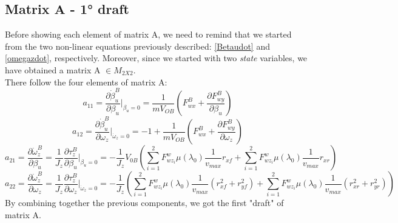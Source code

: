 \subsection{Matrix $\mathbf{A}$ - 1° draft}
	Before showing each element of matrix A, we  need to remind that we started from the two non-linear equations previously described: \ref{Betaudot} and \ref{omegazdot}, respectively. Moreover, since we started with two \textit{state} variables, we have obtained a matrix A $\in M_{2X2}$.\\ There follow the four elements of matrix A:
		\begin{equation} \label{a11}
			a_{11} = \frac{\partial\dot{\beta}_{u}^{B}}{\partial\beta_{u}}\vert_{\beta_{u}=0}  = \frac{1}{mV_{OB}}(F_{wx}^{B} + \frac{\partial F_{wy}^{B}}{\partial\beta_{u}})
		\end{equation} 
		\begin{equation} \label{a12}
			a_{12} = \frac{\partial\dot{\beta}_{u}^{B}}{\partial\omega_{z}}\vert_{\dot\omega_{z}=0} = -1 + \frac{1}{mV_{OB}} (F_{wx}^{B} + \frac{\partial F_{wy}^{B}}{\partial\omega_{z}})
		\end{equation} 
		\begin{equation} \label{a21}
			a_{21} = \frac{\partial\dot{\omega}_{z}^{B}}{\partial\beta_{u}} = \frac{1}{J_{z}} \frac{\partial\tau_{z}^{B}}{\partial\beta_{u}} \vert_{\beta_{u}=0} = -\frac{1}{J_{z}} V_{0B} (\sum\limits_{i=1}^2 F_{wz_{i}}^{w} \mu(\lambda_{0}) \frac{1}{v_{max}}r_{xf} + \sum\limits_{i=1}^2 F_{wz_{i}}^{w} \mu(\lambda_{0}) \frac{1}{v_{max}}r_{xr})
		\end{equation}
		\begin{equation} \label{a22}
			a_{22} = \frac{\partial\dot{\omega}_{z}^{B}}{\partial\omega_{z}} = \frac{1}{J_{z}} \frac{\partial\tau_{z}^{B}}{\partial\omega_{z}}\vert_{\dot\omega_{z}=0} = -\frac{1}{J_{z}}(\sum\limits_{i=1}^2 F_{wz_{i}}^{w} \mu(\lambda_{0}) \frac{1}{v_{max}} (r_{xf}^{2} + r_{yf}^{2}) + \sum\limits_{i=1}^2 F_{wz_{i}}^{w} \mu(\lambda_{0}) \frac{1}{v_{max}} (r_{xr}^{2} + r_{yr}^{2}))
		\end{equation}
	By combining together the previous components, we got the first "draft" of matrix A.
